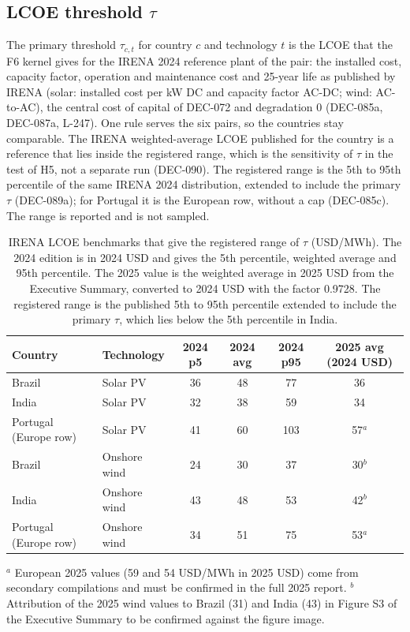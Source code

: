 \subsection{LCOE threshold $\tau$}
\label{sec:g4-tau}
The primary threshold $\tau_{c,t}$ for country $c$ and technology $t$ is the LCOE that the F6 kernel gives for the IRENA 2024 reference plant of the pair: the installed cost, capacity factor, operation and maintenance cost and 25-year life as published by IRENA (solar: installed cost per kW DC and capacity factor AC-DC; wind: AC-to-AC), the central cost of capital of DEC-072 and degradation 0 (DEC-085a, DEC-087a, L-247). One rule serves the six pairs, so the countries stay comparable. The IRENA weighted-average LCOE published for the country is a reference that lies inside the registered range, which is the sensitivity of $\tau$ in the test of H5, not a separate run (DEC-090). The registered range is the 5th to 95th percentile of the same IRENA 2024 distribution, extended to include the primary $\tau$ (DEC-089a); for Portugal it is the European row, without a cap (DEC-085c). The range is reported and is not sampled.

\begin{table}[ht]
\centering
\caption{IRENA LCOE benchmarks that give the registered range of $\tau$ (USD/MWh). The 2024 edition is in 2024 USD and gives the 5th percentile, weighted average and 95th percentile. The 2025 value is the weighted average in 2025 USD from the Executive Summary, converted to 2024 USD with the factor 0.9728. The registered range is the published 5th to 95th percentile extended to include the primary $\tau$, which lies below the 5th percentile in India.}
\label{tab:g4-tau}
\small
\begin{tabular}{llcccc}
\toprule
Country & Technology & 2024 p5 & 2024 avg & 2024 p95 & 2025 avg (2024 USD) \\
\midrule
Brazil   & Solar PV      & 36 & 48 & 77  & 36 \\
India    & Solar PV      & 32 & 38 & 59  & 34 \\
Portugal (Europe row) & Solar PV & 41 & 60 & 103 & 57$^{a}$ \\
Brazil   & Onshore wind  & 24 & 30 & 37  & 30$^{b}$ \\
India    & Onshore wind  & 43 & 48 & 53  & 42$^{b}$ \\
Portugal (Europe row) & Onshore wind & 34 & 51 & 75 & 53$^{a}$ \\
\bottomrule
\end{tabular}

\vspace{2pt}
\footnotesize $^{a}$ European 2025 values (59 and 54 USD/MWh in 2025 USD) come from secondary compilations and must be confirmed in the full 2025 report. %
$^{b}$ Attribution of the 2025 wind values to Brazil (31) and India (43) in Figure S3 of the Executive Summary to be confirmed against the figure image.
\end{table}

